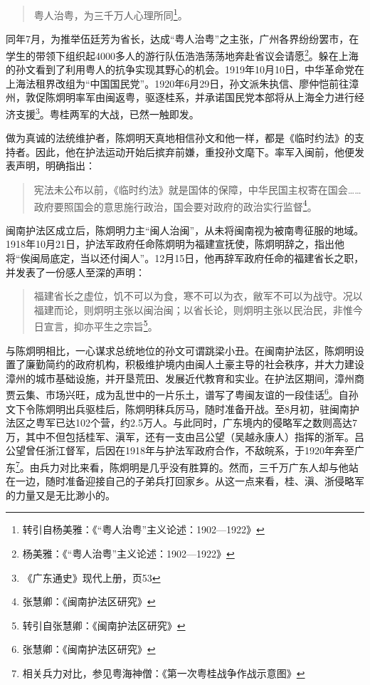 \begin{quote}
粤人治粤，为三千万人心理所同\footnote{转引自杨美雅：《“粤人治粤”主义论述：1902—1922》}。
\end{quote}

同年7月，为推举伍廷芳为省长，达成“粤人治粤”之主张，广州各界纷纷罢市，在学生的带领下组织起4000多人的游行队伍浩浩荡荡地奔赴省议会请愿\footnote{杨美雅：《“粤人治粤”主义论述：1902—1922》}。躲在上海的孙文看到了利用粤人的抗争实现其野心的机会。1919年10月10日，中华革命党在上海法租界改组为“中国国民党”。1920年6月29日，孙文派朱执信、廖仲恺前往漳州，敦促陈炯明率军由闽返粤，驱逐桂系，并承诺国民党本部将从上海全力进行经济支援\footnote{《广东通史》现代上册，页53}。粤桂两军的大战，已然一触即发。

做为真诚的法统维护者，陈炯明天真地相信孙文和他一样，都是《临时约法》的支持者。因此，他在护法运动开始后摈弃前嫌，重投孙文麾下。率军入闽前，他便发表声明，明确指出：

\begin{quote}
宪法未公布以前，《临时约法》就是国体的保障，中华民国主权寄在国会……政府要照国会的意思施行政治，国会要对政府的政治实行监督\footnote{张慧卿：《闽南护法区研究》}。
\end{quote}

闽南护法区成立后，陈炯明力主“闽人治闽”，从未将闽南视为被南粤征服的地域。1918年10月21日，护法军政府任命陈炯明为福建宣抚使，陈炯明辞之，指出他将“俟闽局底定，当以还付闽人”。12月15日，他再辞军政府任命的福建省长之职，并发表了一份感人至深的声明：

\begin{quote}
福建省长之虚位，饥不可以为食，寒不可以为衣，敝军不可以为战守。况以福建而论，则炯明主张以闽治闽；以省长论，则炯明主张以民治民，非惟今日宣言，抑亦平生之宗旨\footnote{转引自张慧卿：《闽南护法区研究》}。
\end{quote}

与陈炯明相比，一心谋求总统地位的孙文可谓跳梁小丑。在闽南护法区，陈炯明设置了廉勤简约的政府机构，积极维护境内由闽人土豪主导的社会秩序，并大力建设漳州的城市基础设施，并开垦荒田、发展近代教育和实业。在护法区期间，漳州商贾云集、市场兴旺，成为乱世中的一片乐土，谱写了粤闽友谊的一段佳话\footnote{张慧卿：《闽南护法区研究》}。自孙文下令陈炯明出兵驱桂后，陈炯明秣兵厉马，随时准备开战。至8月初，驻闽南护法区之粤军已达102个营，约2.5万人。与此同时，广东境内的侵略军之数则高达7万，其中不但包括桂军、滇军，还有一支由吕公望（吴越永康人）指挥的浙军。吕公望曾任浙江督军，后因在1918年与护法军政府合作，不敌皖系，于1920年奔至广东\footnote{相关兵力对比，参见粤海神僧：《第一次粤桂战争作战示意图》}。由兵力对比来看，陈炯明是几乎没有胜算的。然而，三千万广东人却与他站在一边，随时准备迎接自己的子弟兵打回家乡。从这一点来看，桂、滇、浙侵略军的力量又是无比渺小的。

